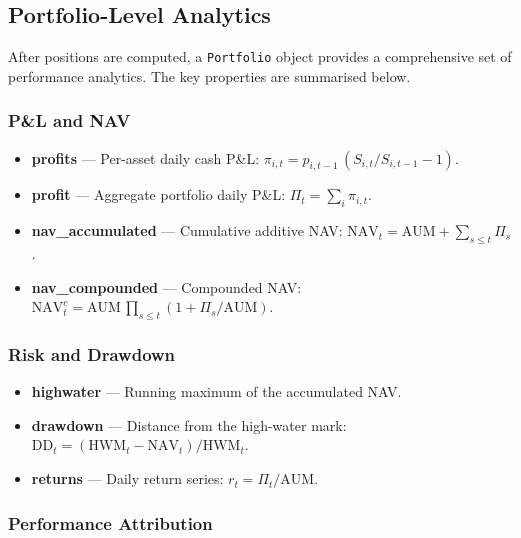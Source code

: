\documentclass[11pt,a4paper]{article}
\begin{document}
\subsection{Portfolio-Level Analytics}
\label{sec:portfolio_analytics}

After positions are computed, a \texttt{Portfolio} object provides a
comprehensive set of performance analytics.  The key properties are
summarised below.

\subsubsection{P\&L and NAV}

\begin{itemize}
  \item \textbf{profits} --- Per-asset daily cash P\&L:
    $\pi_{i,t} = p_{i,t-1}\,(S_{i,t}/S_{i,t-1} - 1)$.
  \item \textbf{profit} --- Aggregate portfolio daily P\&L:
    $\Pi_t = \sum_i \pi_{i,t}$.
  \item \textbf{nav\_accumulated} --- Cumulative additive NAV:
    $\text{NAV}_t = \text{AUM} + \sum_{s\leq t}\Pi_s$.
  \item \textbf{nav\_compounded} --- Compounded NAV:
    $\text{NAV}_t^c = \text{AUM}\,\prod_{s\leq t}(1 + \Pi_s/\text{AUM})$.
\end{itemize}

\subsubsection{Risk and Drawdown}

\begin{itemize}
  \item \textbf{highwater} --- Running maximum of the accumulated NAV.
  \item \textbf{drawdown} --- Distance from the high-water mark:
    $\text{DD}_t = (\text{HWM}_t - \text{NAV}_t)/\text{HWM}_t$.
  \item \textbf{returns} --- Daily return series: $r_t = \Pi_t / \text{AUM}$.
\end{itemize}

\subsubsection{Performance Attribution}
\end{document}
